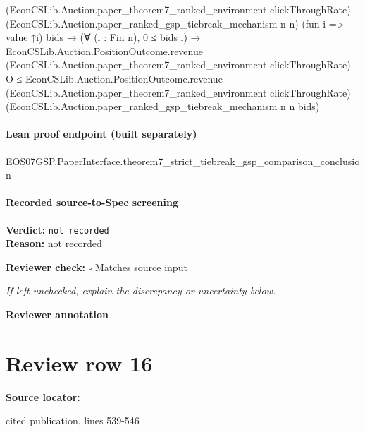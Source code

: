 \documentclass[10pt]{article}
\newcommand{\reviewerbox}{%
  \par\noindent\fbox{\parbox{0.96\linewidth}{\rule{0pt}{0.38in}}}\par
}
\newcommand{\reviewmatch}[1]{%
  \par\noindent\textbf{Reviewer check:} $\square$\; #1\par
  \noindent\emph{If left unchecked, explain the discrepancy or uncertainty below.}\par
}
\begin{document}
\begin{ReviewVerbatim}
                                        (EconCSLib.Auction.paper_theorem7_ranked_environment clickThroughRate)
                                        (EconCSLib.Auction.paper_ranked_gsp_tiebreak_mechanism n n) (fun i => value ↑i)
                                        bids →
                                      (∀ (i : Fin n), 0 ≤ bids i) →
                                        EconCSLib.Auction.PositionOutcome.revenue
                                            (EconCSLib.Auction.paper_theorem7_ranked_environment clickThroughRate) O ≤
                                          EconCSLib.Auction.PositionOutcome.revenue
                                            (EconCSLib.Auction.paper_theorem7_ranked_environment clickThroughRate)
                                            (EconCSLib.Auction.paper_ranked_gsp_tiebreak_mechanism n n bids)
\end{ReviewVerbatim}

\paragraph{Lean proof endpoint (built separately)}\begin{ReviewVerbatim}
EOS07GSP.PaperInterface.theorem7_strict_tiebreak_gsp_comparison_conclusion
\end{ReviewVerbatim}

\paragraph{Recorded source-to-Spec screening}
\textbf{Verdict:} \texttt{not recorded}
\\
\textbf{Reason:} not recorded
\reviewmatch{Matches source input}
\noindent\textbf{Reviewer annotation}\par
\reviewerbox
\clearpage
\hypertarget{source-claim-b11813bd0b76c1f2}{}
\section*{Review row 16}
\textbf{Source locator:} {\footnotesize\raggedright cited publication, lines 539-\allowbreak{}546\par}
\end{document}
